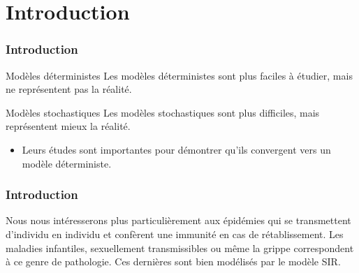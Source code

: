 \section{Introduction}

\begin{frame}
    \frametitle{Introduction}

    \begin{block}{Modèles déterministes}
        Les modèles déterministes sont plus faciles à étudier, mais ne représentent pas la réalité.
    \end{block}


    \begin{block}{Modèles stochastiques}
        Les modèles stochastiques sont plus difficiles, mais représentent mieux la réalité.

        \begin{itemize}
            \item Leurs études sont importantes pour démontrer qu'ils convergent vers un modèle déterministe.
        \end{itemize}
    \end{block}
\end{frame}

\begin{frame}
    \frametitle{Introduction}

    Nous nous intéresserons plus particulièrement aux épidémies qui se transmettent d’individu en individu et confèrent une immunité en cas de rétablissement. Les maladies infantiles, sexuellement transmissibles ou même la grippe correspondent à ce genre de pathologie. Ces dernières sont bien modélisés par le modèle SIR.

\end{frame}
